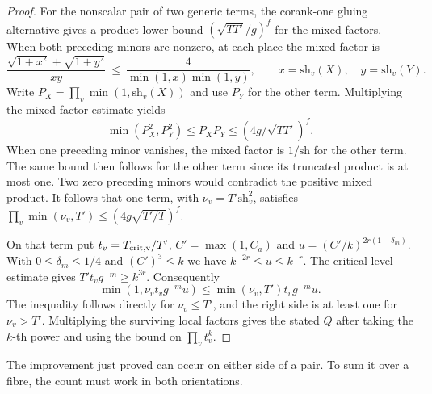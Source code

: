 \begin{proof}
For the nonscalar pair of two generic terms, the corank-one
gluing alternative gives a product lower bound
\((\sqrt{TT'}/g)^f\) for the mixed factors. When both preceding
minors are nonzero, at each place the mixed factor is
\[
 \frac{\sqrt{1+x^2}+\sqrt{1+y^2}}{xy}
 \ \le\ \frac4{\min(1,x)\min(1,y)},\qquad
 x=\mathrm{sh}_v(X),\quad y=\mathrm{sh}_v(Y).
\]
Write \(P_X=\prod_v\min(1,\mathrm{sh}_v(X))\) and use \(P_Y\)
for the other term. Multiplying the mixed-factor estimate yields
\[
      \min(P_X^2,P_Y^2)\le P_XP_Y
                          \le (4g/\sqrt{TT'})^f .
\] When one preceding minor vanishes,
the mixed factor is \(1/\mathrm{sh}\) for the other term.
The same bound then follows for the other term since its
truncated product is at most one. Two zero preceding minors
would contradict the positive mixed product. It follows that
one term, with \(\nu_v=T'\mathrm{sh}_v^2\), satisfies
\(\prod_v\min(\nu_v,T')\le(4g\sqrt{T'/T})^f\).

On that term put \(t_v=T_{\rm crit,v}/T'\),
\(C'=\max(1,C_a)\) and \(u=(C'/k)^{2r(1-\delta_m)}\).
With \(0\le\delta_m\le1/4\) and \((C')^3\le k\) we have
\(k^{-2r}\le u\le k^{-r}\). The critical-level estimate
gives \(T't_v g^{-m}\ge k^{3r}\). Consequently
\[
 \min(1,\nu_vt_v g^{-m}u)
       \le \min(\nu_v,T')t_v g^{-m}u .
\]
The inequality follows directly for \(\nu_v\le T'\), and the
right side is at least one for \(\nu_v>T'\).
Multiplying the surviving local factors gives the stated \(Q\)
after taking the \(k\)-th power and using the bound on \(\prod_v t_v^k\).
\end{proof}

The improvement just proved can occur on either side of a pair. To sum it over a fibre, the count must work in both orientations.


